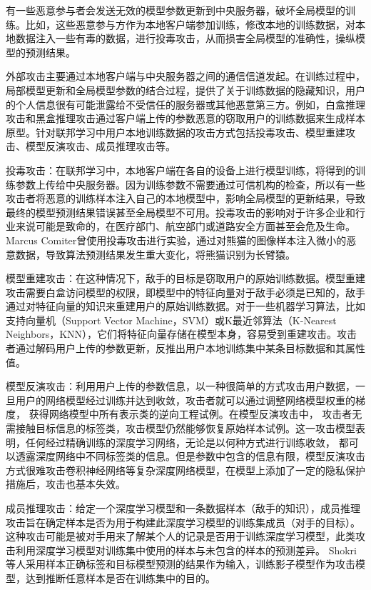 有一些恶意参与者会发送无效的模型参数更新到中央服务器，破坏全局模型的训练。比如，这些恶意参与方作为本地客户端参加训练，修改本地的训练数据，对本地数据注入一些有毒的数据，进行投毒攻击，从而损害全局模型的准确性，操纵模型的预测结果。

外部攻击主要通过本地客户端与中央服务器之间的通信信道发起。在训练过程中，局部模型更新和全局模型参数的结合过程，提供了关于训练数据的隐藏知识，用户的个人信息很有可能泄露给不受信任的服务器或其他恶意第三方。例如，白盒推理攻击和黑盒推理攻击通过客户端上传的参数恶意的窃取用户的训练数据来生成样本原型。针对联邦学习中用户本地训练数据的攻击方式包括投毒攻击、模型重建攻击、模型反演攻击、成员推理攻击等。

投毒攻击：在联邦学习中，本地客户端在各自的设备上进行模型训练，将得到的训练参数上传给中央服务器。因为训练参数不需要通过可信机构的检查，所以有一些攻击者将恶意的训练样本注入自己的本地模型中，影响全局模型的更新结果，导致最终的模型预测结果错误甚至全局模型不可用。投毒攻击的影响对于许多企业和行业来说可能是致命的，在医疗部门、航空部门或道路安全方面甚至会危及生命。Marcus Comiter曾使用投毒攻击进行实验，通过对熊猫的图像样本注入微小的恶意数据，导致算法预测结果发生重大变化，将熊猫识别为长臂猿。

模型重建攻击：在这种情况下，敌手的目标是窃取用户的原始训练数据。模型重建攻击需要白盒访问模型的权限，即模型中的特征向量对于敌手必须是已知的，敌手通过对特征向量的知识来重建用户的原始训练数据。对于一些机器学习算法，比如支持向量机（Support Vector Machine，SVM）或K最近邻算法（K-Nearest Neighbors，KNN），它们将特征向量存储在模型本身，容易受到重建攻击。攻击者通过解码用户上传的参数更新，反推出用户本地训练集中某条目标数据和其属性值。

模型反演攻击：利用用户上传的参数信息，以一种很简单的方式攻击用户数据，一旦用户的网络模型经过训练并达到收敛，攻击者就可以通过调整网络模型权重的梯度， 获得网络模型中所有表示类的逆向工程试例。在模型反演攻击中， 攻击者无需接触目标信息的标签类，攻击模型仍然能够恢复原始样本试例。这一攻击模型表明，任何经过精确训练的深度学习网络，无论是以何种方式进行训练收敛， 都可以透露深度网络中不同标签类的信息。但是参数中包含的信息有限，模型反演攻击方式很难攻击卷积神经网络等复杂深度网络模型，在模型上添加了一定的隐私保护措施后，攻击也基本失效。

成员推理攻击：给定一个深度学习模型和一条数据样本（敌手的知识），成员推理攻击旨在确定样本是否为用于构建此深度学习模型的训练集成员（对手的目标）。这种攻击可能是被对手用来了解某个人的记录是否用于训练深度学习模型，此类攻击利用深度学习模型对训练集中使用的样本与未包含的样本的预测差异。 Shokri 等人采用样本正确标签和目标模型预测的结果作为输入，训练影子模型作为攻击模型，达到推断任意样本是否在训练集中的目的。

